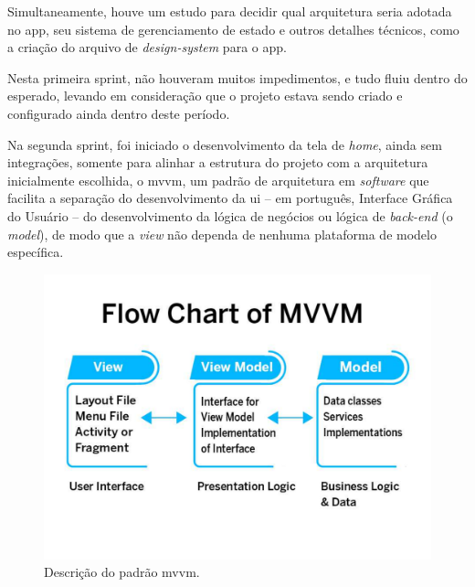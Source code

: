 Simultaneamente, houve um estudo para decidir qual arquitetura seria adotada no \ac{app}, seu sistema de gerenciamento de estado e outros detalhes técnicos, como a criação do arquivo de \textit{design-system} para o \ac{app}. 

Nesta primeira sprint, não houveram muitos impedimentos, e tudo fluiu dentro do esperado, levando em consideração que o projeto estava sendo criado e configurado ainda dentro deste período.

Na segunda sprint, foi iniciado o desenvolvimento da tela de \textit{home}, ainda sem integrações, somente para alinhar a estrutura do projeto com a arquitetura inicialmente escolhida, o \ac{mvvm}, um padrão de arquitetura em \textit{software} que facilita a separação do desenvolvimento da \ac{ui} – em português, Interface Gráfica do Usuário – do desenvolvimento da lógica de negócios ou lógica de \textit{back-end} (o \textit{model}), de modo que a \textit{view} não dependa de nenhuma plataforma de modelo específica.

\begin{figure}[H]
\centering
  \includegraphics[width=\columnwidth/2]{images/MVVM-architecture.pdf}
  \caption{Descrição do padrão \ac{mvvm}.}
  \label{fig:MVVM-architecture}
\end{figure}

